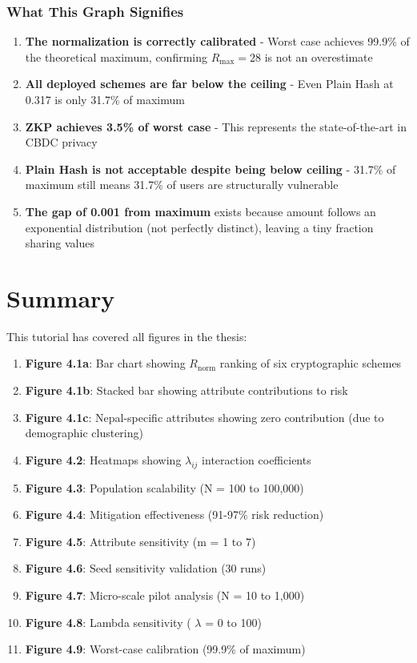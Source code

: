 \documentclass[12pt,a4paper,oneside,openany]{report}
\begin{document}
\begin{enumerate}
\subsection{What This Graph Signifies}
\begin{enumerate}
    \item \textbf{The normalization is correctly calibrated} - Worst case achieves 99.9\% of the theoretical maximum, confirming $R_{\mathrm{max}}=28$ is not an overestimate
    \item \textbf{All deployed schemes are far below the ceiling} - Even Plain Hash at 0.317 is only 31.7\% of maximum
    \item \textbf{ZKP achieves 3.5\% of worst case} - This represents the state-of-the-art in CBDC privacy
    \item \textbf{Plain Hash is not acceptable despite being below ceiling} - 31.7\% of maximum still means 31.7\% of users are structurally vulnerable
    \item \textbf{The gap of 0.001 from maximum} exists because amount follows an exponential distribution (not perfectly distinct), leaving a tiny fraction sharing values
\end{enumerate}

\chapter{Summary}
\label{chap:summary}

This tutorial has covered all figures in the thesis:

\begin{enumerate}
    \item \textbf{Figure 4.1a}: Bar chart showing $R_{\mathrm{norm}}$ ranking of six cryptographic schemes
    \item \textbf{Figure 4.1b}: Stacked bar showing attribute contributions to risk
    \item \textbf{Figure 4.1c}: Nepal-specific attributes showing zero contribution (due to demographic clustering)
    \item \textbf{Figure 4.2}: Heatmaps showing $\lambda_{ij}$ interaction coefficients
    \item \textbf{Figure 4.3}: Population scalability (N = 100 to 100,000)
    \item \textbf{Figure 4.4}: Mitigation effectiveness (91-97\% risk reduction)
    \item \textbf{Figure 4.5}: Attribute sensitivity (m = 1 to 7)
    \item \textbf{Figure 4.6}: Seed sensitivity validation (30 runs)
    \item \textbf{Figure 4.7}: Micro-scale pilot analysis (N = 10 to 1,000)
    \item \textbf{Figure 4.8}: Lambda sensitivity ( $\lambda$ = 0 to 100)
    \item \textbf{Figure 4.9}: Worst-case calibration (99.9\% of maximum)
\end{enumerate}


\end{enumerate}
\end{document}
